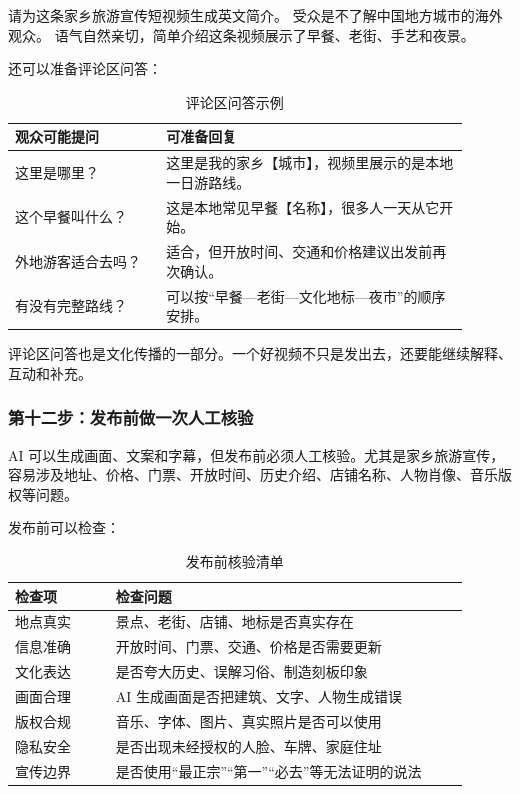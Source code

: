 \begin{tcolorbox}[promptbox]
请为这条家乡旅游宣传短视频生成英文简介。
受众是不了解中国地方城市的海外观众。
语气自然亲切，简单介绍这条视频展示了早餐、老街、手艺和夜景。
\end{tcolorbox}

还可以准备评论区问答：

\begin{table}[H]
\centering
\caption{评论区问答示例}
\label{tab:comment-qa-example}
\begin{tabular}{p{0.30\linewidth} p{0.60\linewidth}}
\toprule
\textbf{观众可能提问} & \textbf{可准备回复} \\
\midrule
这里是哪里？ & 这里是我的家乡【城市】，视频里展示的是本地一日游路线。 \\
这个早餐叫什么？ & 这是本地常见早餐【名称】，很多人一天从它开始。 \\
外地游客适合去吗？ & 适合，但开放时间、交通和价格建议出发前再次确认。 \\
有没有完整路线？ & 可以按“早餐—老街—文化地标—夜市”的顺序安排。 \\
\bottomrule
\end{tabular}
\end{table}

评论区问答也是文化传播的一部分。一个好视频不只是发出去，还要能继续解释、互动和补充。

\subsubsection*{第十二步：发布前做一次人工核验}

AI 可以生成画面、文案和字幕，但发布前必须人工核验。尤其是家乡旅游宣传，容易涉及地址、价格、门票、开放时间、历史介绍、店铺名称、人物肖像、音乐版权等问题。

发布前可以检查：

\begin{table}[H]
\centering
\caption{发布前核验清单}
\label{tab:publish-checklist}
\begin{tabular}{p{0.20\linewidth} p{0.70\linewidth}}
\toprule
\textbf{检查项} & \textbf{检查问题} \\
\midrule
地点真实 & 景点、老街、店铺、地标是否真实存在 \\
信息准确 & 开放时间、门票、交通、价格是否需要更新 \\
文化表达 & 是否夸大历史、误解习俗、制造刻板印象 \\
画面合理 & AI 生成画面是否把建筑、文字、人物生成错误 \\
版权合规 & 音乐、字体、图片、真实照片是否可以使用 \\
隐私安全 & 是否出现未经授权的人脸、车牌、家庭住址 \\
宣传边界 & 是否使用“最正宗”“第一”“必去”等无法证明的说法 \\
\bottomrule
\end{tabular}
\end{table}


